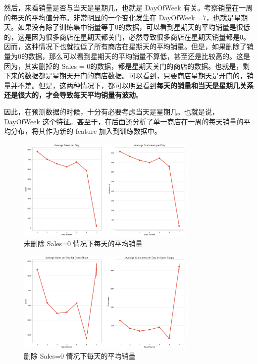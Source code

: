 \documentclass[a4paper]{article}
\begin{document}
然后，来看销量是否与当天是星期几，也就是 DayOfWeek 有关。考察销量在一周的每天的平均值分布。非常明显的一个变化发生在 DayOfWeek =7，也就是星期天。如果没有除了训练集中销量等于0的数据，可以看到星期天的平均销量是很低的，这是因为很多商店在星期天都关门，必然导致很多商店在星期天销量都是0。因而，这种情况下也就拉低了所有商店在星期天的平均销量。但是，如果删除了销量为0的数据，那么可以看到星期天的平均销量不算低，甚至还是比较高的。这是因为，其实删掉的 Sales = 0的数据，都是星期天关门的商店的数据。也就是，剩下来的数据都是星期天开门的商店数据。可以看到，只要商店星期天是开门的，销量并不差。但是，这两种情况下，都可以明显看到\textbf{每天的销量和当天是星期几关系还是很大的，才会导致每天平均销量有波动}。


因此，在预测数据的时候，十分有必要考虑当天是星期几。也就是说，DayOfWeek 这个特征。甚至于，在后面还分析了单一商店在一周的每天销量的平均分布，将其作为新的 feature 加入到训练数据中。
\begin{figure}[ht]
 \centering
 \includegraphics[height=5cm]{images/train-perday-nofilter.png}
 \caption{未删除 Sales=0 情况下每天的平均销量}
 \label{fig:nofilter}
\end{figure}

\begin{figure}[ht]
 \centering
 \includegraphics[height=5cm]{images/train-per-day-filter.png}
 \caption{删除 Sales=0 情况下每天的平均销量}
 \label{fig:filter}
\end{figure}
\end{document}
